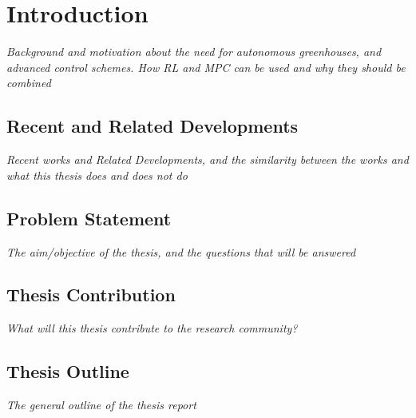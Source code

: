 \chapter{Introduction}
\label{chapter:introduction, written in the present tense}

\emph{Background and motivation about the need for autonomous greenhouses, and advanced control schemes. How RL and MPC can be used and why they should be combined}


\section{Recent and Related Developments}
\emph{Recent works and Related Developments, and the similarity between the works and what this thesis does and does not do}
\section{Problem Statement}
\emph{The aim/objective of the thesis, and the questions that will be answered}

\section{Thesis Contribution}
\emph{What will this thesis contribute to the research community?}

\section{Thesis Outline}
\emph{The general outline of the thesis report}

